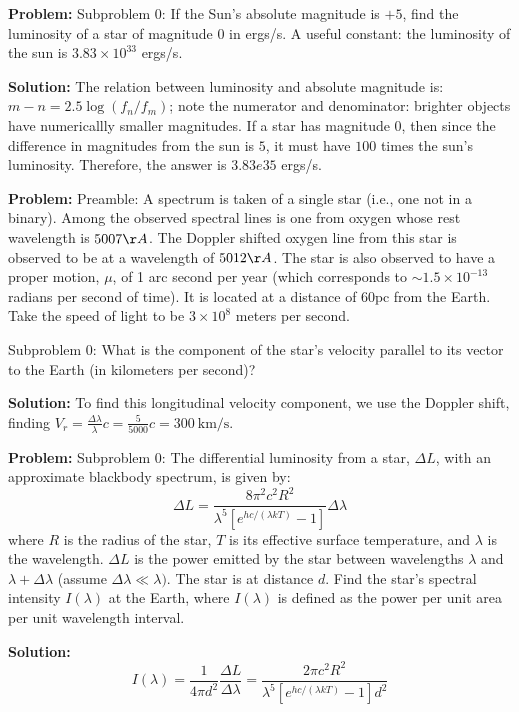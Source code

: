 \documentclass[10pt]{article}
\begin{document}
\textbf{Problem:}
Subproblem 0: If the Sun's absolute magnitude is $+5$, find the luminosity of a star of magnitude $0$ in ergs/s. A useful constant: the luminosity of the sun is $3.83 \times 10^{33}$ ergs/s.


\textbf{Solution:}
The relation between luminosity and absolute magnitude is: $m - n = 2.5 \log (f_n/f_m)$; note the numerator and denominator: brighter objects have numericallly smaller magnitudes.  If a star has magnitude $0$, then since the difference in magnitudes from the sun is $5$, it must have $100$ times the sun's luminosity.  Therefore, the answer is $\boxed{3.83e35}$ ergs/s.


\textbf{Problem:}
Preamble: A spectrum is taken of a single star (i.e., one not in a binary). Among the observed spectral lines is one from oxygen whose rest wavelength is $5007 \AA$. The Doppler shifted oxygen line from this star is observed to be at a wavelength of $5012 \AA$. The star is also observed to have a proper motion, $\mu$, of 1 arc second per year (which corresponds to $\sim 1.5 \times 10^{-13}$ radians per second of time). It is located at a distance of $60 \mathrm{pc}$ from the Earth. Take the speed of light to be $3 \times 10^8$ meters per second.

Subproblem 0: What is the component of the star's velocity parallel to its vector to the Earth (in kilometers per second)?


\textbf{Solution:}
To find this longitudinal velocity component, we use the Doppler shift, finding $V_{r}=\frac{\Delta \lambda}{\lambda} c=\frac{5}{5000} c=\boxed{300} \mathrm{~km} / \mathrm{s}$.


\textbf{Problem:}
Subproblem 0: The differential luminosity from a star, $\Delta L$, with an approximate blackbody spectrum, is given by:
\[
\Delta L=\frac{8 \pi^{2} c^{2} R^{2}}{\lambda^{5}\left[e^{h c /(\lambda k T)}-1\right]} \Delta \lambda
\]
where $R$ is the radius of the star, $T$ is its effective surface temperature, and $\lambda$ is the wavelength. $\Delta L$ is the power emitted by the star between wavelengths $\lambda$ and $\lambda+\Delta \lambda$ (assume $\Delta \lambda \ll \lambda)$. The star is at distance $d$. Find the star's spectral intensity $I(\lambda)$ at the Earth, where $I(\lambda)$ is defined as the power per unit area per unit wavelength interval.


\textbf{Solution:}
\[
I(\lambda)=\frac{1}{4 \pi d^{2}} \frac{\Delta L}{\Delta \lambda}=\boxed{\frac{2 \pi c^{2} R^{2}}{\lambda^{5}\left[e^{h c /(\lambda k T)}-1\right] d^{2}}}
\]
\end{document}
